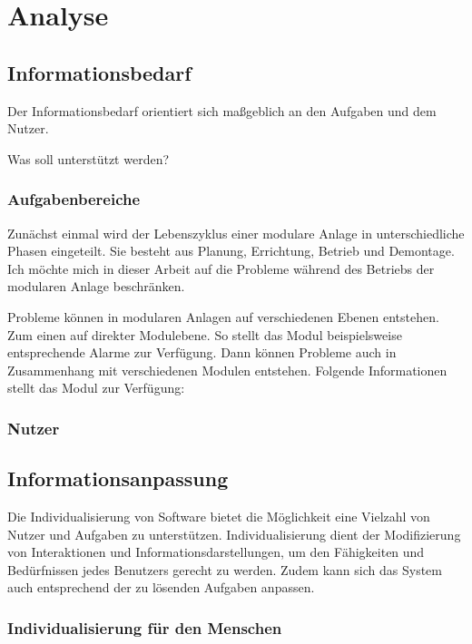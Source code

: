 
\chapter{Analyse}
\label{sec:Anforderungsanalyse}

\section{Informationsbedarf}
Der Informationsbedarf orientiert sich maßgeblich an den Aufgaben und dem Nutzer.

Was soll unterstützt werden?

\subsection{Aufgabenbereiche}
Zunächst einmal wird der Lebenszyklus einer modulare Anlage in unterschiedliche Phasen eingeteilt. Sie besteht aus Planung, Errichtung, Betrieb und Demontage. \cite{} Ich möchte mich in dieser Arbeit auf die Probleme während des Betriebs der modularen Anlage beschränken.

Probleme können in modularen Anlagen auf verschiedenen Ebenen entstehen. Zum einen auf direkter Modulebene. So stellt das Modul beispielsweise entsprechende Alarme zur Verfügung. Dann können Probleme auch in Zusammenhang mit verschiedenen Modulen entstehen. Folgende Informationen stellt das Modul zur Verfügung:

\subsection{Nutzer}


\section{Informationsanpassung}
Die Individualisierung von Software bietet die Möglichkeit eine Vielzahl von Nutzer und Aufgaben zu unterstützen. Individualisierung dient der Modifizierung von Interaktionen und Informationsdarstellungen, um den Fähigkeiten und Bedürfnissen jedes Benutzers gerecht zu werden. Zudem kann sich das System auch entsprechend der zu lösenden Aufgaben anpassen.

\subsection{Individualisierung für den Menschen}

